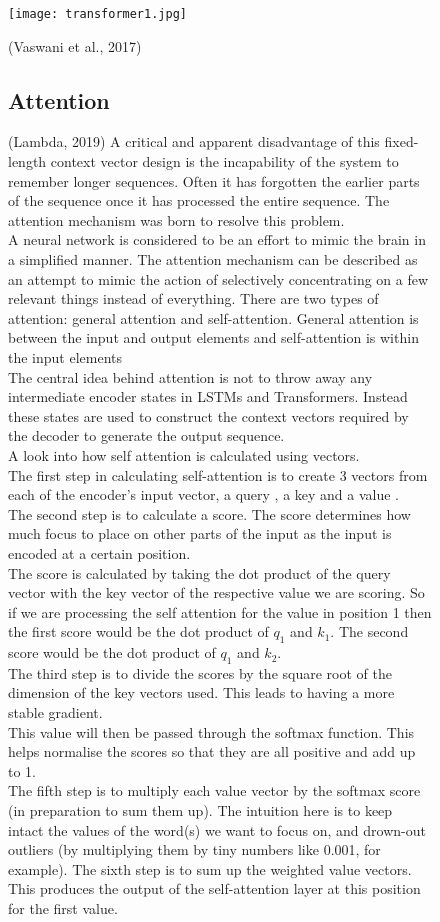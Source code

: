 \documentclass{article}
\begin{document}
\begin{figure}[h!]
    \centering
    \texttt{[image: transformer1.jpg]}
    \caption{}
(Vaswani et al., 2017)

\subsection{Attention}
(Lambda, 2019)
A critical and apparent disadvantage of this fixed-length context vector design is the incapability
of the system to remember longer sequences. Often it has forgotten the earlier parts of the
sequence once it has processed the entire sequence. The attention mechanism was born to resolve
this problem.\\
A neural network is considered to be an effort to mimic the brain in a simplified manner. The
attention mechanism can be described as an attempt to mimic the action of selectively
concentrating on a few relevant things instead of everything. There are two types of attention:
general attention and self-attention. General attention is between the input and output elements
and self-attention is within the input elements\\
The central idea behind attention is not to throw away any intermediate encoder states in LSTMs
and Transformers. Instead these states are used to construct the context vectors required by the
decoder to generate the output sequence.\\
A look into how self attention is calculated using vectors.\\
The first step in calculating self-attention is to create 3 vectors from each of the encoder’s input
vector, a query , a key  and a value .\\
The second step is to calculate a score. The score determines how much focus to place on other
parts of the input as the input is encoded at a certain position.\\
The score is calculated by taking the dot product of the query vector with the key vector of the
respective value we are scoring. So if we are processing the self attention for the value in position
1 then the first score would be the dot product of $q_1$ and $k_1$. The second score would be the dot
product of $q_1$ and $k_2$.\\
The third step is to divide the scores by the square root of the dimension of the key vectors used.
This leads to having a more stable gradient.\\
This value will then be passed through the softmax function. This helps normalise the scores so
that they are all positive and add up to 1.\\
The fifth step is to multiply each value vector by the softmax score (in preparation to sum them
up). The intuition here is to keep intact the values of the word(s) we want to focus on, and
drown-out outliers (by multiplying them by tiny numbers like 0.001, for example).
The sixth step is to sum up the weighted value vectors. This produces the output of the
self-attention layer at this position for the first value.


\end{figure}
\end{document}
